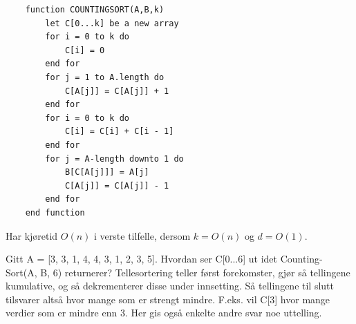 \begin{lstlisting}
    function COUNTINGSORT(A,B,k)
	    let C[0...k] be a new array
    	for i = 0 to k do
    		C[i] = 0
    	end for
    	for j = 1 to A.length do
    		C[A[j]] = C[A[j]] + 1
    	end for
    	for i = 0 to k do
    		C[i] = C[i] + C[i - 1]
    	end for
    	for j = A-length downto 1 do
    		B[C[A[j]]] = A[j]
    		C[A[j]] = C[A[j]] - 1
    	end for
    end function
\end{lstlisting}

\noindent Har kjøretid $O(n)$ i verste tilfelle, dersom $k = O(n)$ og $d = O(1)$.\\

\begin{boxed}
Gitt A = [3, 3, 1, 4, 4, 3, 1, 2, 3, 5]. Hvordan ser C[0...6] ut idet Counting-Sort(A, B, 6) returnerer?
\newline\newline
[0, 0, 2, 3, 7, 9, 10] \newline\newline  Tellesortering teller først forekomster, gjør så tellingene kumulative, og så dekrementerer disse under innsetting. Så tellingene til slutt tilsvarer altså hvor mange som er strengt mindre. F.eks. vil C[3] hvor mange verdier som er mindre enn 3. Her gis også enkelte andre svar noe uttelling.
\end{boxed}

